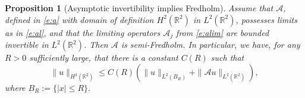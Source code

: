 \documentclass[10pt]{article}
\newtheorem{Proposition}[Lemma]{Proposition}
\newcommand{\R}{\mathbb{R}}
\renewcommand{\leq}{\leqslant}
\begin{document}
%  
% 
\begin{Proposition}[Asymptotic invertibility implies Fredholm]\label{Proposition:closed_range_elliptic_regularity}
Assume that $\mathcal{A}$, defined in \eqref{e:a} with domain of definition $H^2(\R^2)$ in $L^2(\R^2)$, possesses limits as in \eqref{e:al}, and that the limiting operators $\mathcal{A}_j$ from \eqref{e:alim} are bounded invertible in $L^2(\R^2)$.  Then $\mathcal{A}$ is semi-Fredholm. In particular, we have, for any $R>0$ sufficiently large, that there is a constant $C(R)$ such that 
%
\begin{equation*}
\|u \|_{H^2(\mathbb{R}^2)}\leq C(R)\left( \| u\|_{L^2(B_R)} + \|\mathcal{A}u \|_{L^2(\mathbb{R}^2)}\right),
\end{equation*}
where $B_R:=\{|x|\leq R\}.$
\end{Proposition}
\end{document}
